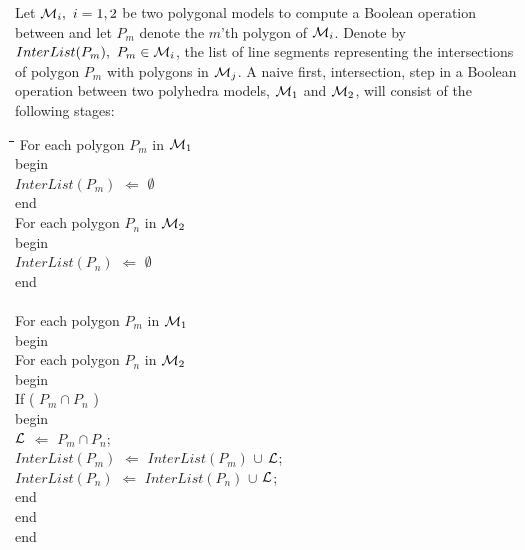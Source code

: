 Let ${\cal M}_i,~i = 1,2$ be two polygonal models to compute a Boolean
operation between and let $P_m$ denote the $m$'th polygon of ${\cal M}_i$.
Denote by $InterList( P_m ),~P_m \in {\cal M}_i$, the list of line
segments representing the intersections of polygon $P_m$ with polygons
in ${\cal M}_j$.  A naive first, intersection, step in a Boolean
operation between two polyhedra models, ${\cal M}_1$ and ${\cal M}_2$,
will consist of the following stages:
\begin{bf}
\begin{tt}
\begin{tabbing}
\hspace{2em}\=\hspace{2em}\=\hspace{2em}\=\hspace{2em}\=\hspace{2em}\=\hspace{2em}\=\kill
\> For each polygon $P_m$ in ${\cal M}_1$ \\
\> begin \\
\> \> $InterList( P_m )$ $\Leftarrow$ $\emptyset$ \\
\> end \\
\> For each polygon $P_n$ in ${\cal M}_2$ \\
\> begin \\
\> \> $InterList( P_n )$ $\Leftarrow$ $\emptyset$ \\
\> end \\
\\
\> For each polygon $P_m$ in ${\cal M}_1$ \\
\> begin \\
\> \> For each polygon $P_n$ in ${\cal M}_2$ \\
\> \> begin \\
\> \> \> If ( $P_m \cap P_n$ ) \\
\> \> \> begin \\
\> \> \> \> ${\cal L}$ $\Leftarrow$ $P_m \cap P_n$; \\
\> \> \> \> $InterList( P_m )$ $\Leftarrow$ $InterList( P_m )$ $\cup$ ${\cal L}$; \\
\> \> \> \> $InterList( P_n )$ $\Leftarrow$ $InterList( P_n )$ $\cup$ ${\cal L}$; \\
\> \> \> end \\
\> \> end \\
\> end
\end{tabbing}
\end{tt}
\end{bf}

